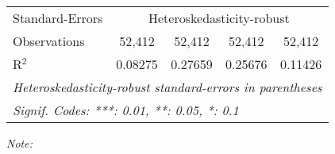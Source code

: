 \begin{table}[htbp!]
\begin{adjustbox}{width = 1\textwidth, max height = 0.95\textheight, center}
\begin{threeparttable}[b]
\begin{tabular}{lcccc}
            \midrule 
            Standard-Errors & \multicolumn{4}{c}{Heteroskedasticity-robust} \\ 
            Observations         & 52,412                         & 52,412                         & 52,412                         & 52,412\\  
            R$^2$                & 0.08275                        & 0.27659                        & 0.25676                        & 0.11426\\  
            \midrule \midrule
            \multicolumn{5}{l}{\emph{Heteroskedasticity-robust standard-errors in parentheses}}\\
            \multicolumn{5}{l}{\emph{Signif. Codes: ***: 0.01, **: 0.05, *: 0.1}}\\
         \end{tabular}
         
         \begin{tablenotes}\item \medskip \textit{Note:}
         \end{tablenotes}
      \end{threeparttable}
   \end{adjustbox}
\end{table}


